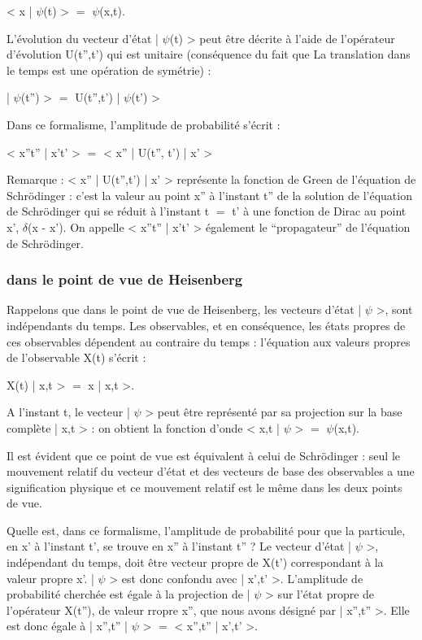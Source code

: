 < x | $\psi$(t) > $=$ $\psi$(x,t).

L'évolution du vecteur d'état | $\psi$(t) > peut être décrite à l'aide
de l'opérateur d'évolution U(t'',t') qui est unitaire (conséquence du fait
que La translation dans le temps est une opération de symétrie) :

| $\psi$(t'') > $=$ U(t'',t') | $\psi$(t') >

Dans ce formalisme, l'amplitude de probabilité s'écrit :

< x''t'' | x't' > $=$ < x'' | U(t'', t') | x' >

Remarque : < x'' | U(t'',t') | x' > représente la fonction de Green
de l'équation de Schrödinger : c'est la valeur au point x'' à l'instant t''
de la solution de l'équation de Schrödinger qui se réduit à l'instant
t $=$ t' à une fonction de Dirac au point x', $\delta$(x - x'). On appelle
< x''t'' | x't' > également le “propagateur'' de l'équation de Schrödinger.

\subsubsection{dans le point de vue de Heisenberg}

Rappelons que dans le point de vue de Heisenberg, les vecteurs
d'état | $\psi$ >, sont indépendants du temps. Les observables, et en conséquence,
les états propres de ces observables dépendent au contraire du
temps : l'équation aux valeurs propres de l'observable X(t) s'écrit :

X(t) | x,t > $=$ x | x,t >.

A l'instant t, le vecteur | $\psi$ > peut être représenté par sa projection
sur la base complète | x,t > : on obtient la fonction d'onde
< x,t | $\psi$ > $=$ $\psi$(x,t).

Il est évident que ce point de vue est équivalent à celui de
Schrödinger : seul le mouvement relatif du vecteur d'état et des vecteurs
de base des observables a une signification physique et ce mouvement
relatif est le même dans les deux points de vue.

Quelle est, dans ce formalisme, l'amplitude de probabilité pour
que la particule, en x' à l'instant t', se trouve en x'' à l'instant t'' ?
Le vecteur d'état | $\psi$ >, indépendant du temps, doit être vecteur propre
de X(t') correspondant à la valeur propre x'. | $\psi$ > est donc confondu
avec | x',t' >. L'amplitude de probabilité cherchée est égale à la projection
de | $\psi$ > sur l'état propre de l'opérateur X(t''), de valeur rropre
x'', que nous avons désigné par | x'',t'' >. Elle est donc égale à
| x'',t'' | $\psi$ > $=$ < x'',t'' | x',t' >.

